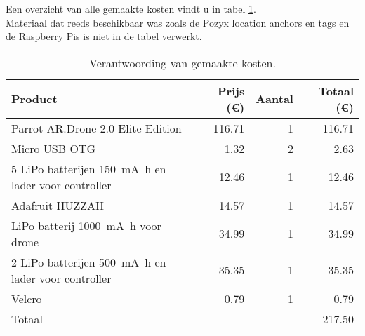 Een overzicht van alle gemaakte kosten vindt u in tabel \ref{tab:kosten}.\\
Materiaal dat reeds beschikbaar was zoals de Pozyx location anchors en tags en de Raspberry Pis is niet in de tabel verwerkt.
\begin{table}[p]
\centering
\begin{tabular}{ |l|r|r|r| } \hline
Product & Prijs (\euro{}) & Aantal & Totaal (\euro{}) \\ [.5ex] \hline \hline
Parrot AR.Drone 2.0 Elite Edition & 116.71 & 1 & 116.71 \\ \hline
Micro USB OTG & 1.32 & 2 & 2.63 \\ \hline
5 LiPo batterijen \SI{150}{\mA\hour} en lader voor controller & 12.46 & 1 & 12.46 \\ \hline
Adafruit HUZZAH & 14.57 & 1 & 14.57 \\ \hline
LiPo batterij \SI{1000}{\mA\hour} voor drone & 34.99 & 1 & 34.99 \\ \hline
2 LiPo batterijen \SI{500}{\mA\hour} en lader voor controller & 35.35 & 1 & 35.35 \\ [.5ex] \hline
Velcro & 0.79 & 1 & 0.79 \\ \hline
\hline
Totaal & & & 217.50 \\ \hline
\end{tabular}
\caption[Kosten]{Verantwoording van gemaakte kosten.}
\label{tab:kosten}
\end{table}